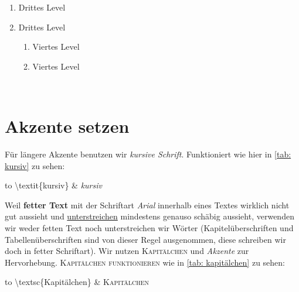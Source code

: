 \begin{table}[h]
\begin{tabu}
\begin{enumerate}
\begin{enumerate}
\begin{enumerate}
																		\item Drittes Level
																		\item Drittes Level
																		\begin{enumerate}
																			\item Viertes Level
																			\item Viertes Level
																		\end{enumerate}
																	\end{enumerate}
																\end{enumerate}
																\end{enumerate}\\%
\bottomrule%
\end{tabu}%
\caption{Listen und Level}%
%
%
\label{tab: listen}%
\end{table}%

\section{Akzente setzen}%
Für längere Akzente benutzen wir \textit{kursive Schrift}. Funktioniert wie hier in \ref{tab: kursiv} zu sehen:\\%
\begin{table}[h]%
\begin{tabu} to \textwidth {X[l]X[l]}%
\toprule%
\textbackslash textit\{kursiv\} & \textit{kursiv}\\%
\bottomrule%
\end{tabu}%
\caption{Kursiv}%
\label{tab: kursiv}%
\end{table}%

Weil \textbf{fetter Text} mit der Schriftart \emph{Arial} innerhalb eines Textes wirklich nicht gut aussieht und \underline{unterstreichen} mindestens genauso schäbig aussieht, verwenden wir weder fetten Text noch unterstreichen wir Wörter (Kapitelüberschriften und Tabellenüberschriften sind von dieser Regel ausgenommen, diese schreiben wir doch in fetter Schriftart). Wir nutzen \textsc{Kapitälchen} und \emph{Akzente} zur Hervorhebung. \textsc{Kapitälchen funktionieren} wie in \ref{tab: kapitälchen} zu sehen:\\%
\begin{table}[h]%
\begin{tabu} to \textwidth {X[l]X[l]}%
\toprule%
\textbackslash textsc\{Kapitälchen\} & \textsc{Kapitälchen} \\%
\bottomrule%
\end{tabu}%
\caption{Kapitälchen}%
\label{tab: kapitälchen}%
\end{table}%

